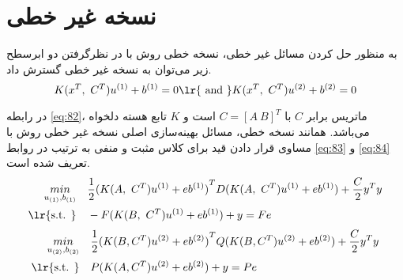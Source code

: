 %	
%	

\section{نسخه غیر خطی}\label{sec:3:3}
به منظور حل کردن مسائل غیر خطی، نسخه خطی روش  با در نظرگرفتن دو ابرسطح  زیر می‌توان به نسخه غیر خطی گسترش داد.
\begin{equation}\label{eq:82}
K({{x}^{T}},~{{C}^{T}}){{u}^{\left( 1 \right)}}+{{b}^{\left( 1 \right)}}=0 \text{\lr{ and }} K({{x}^{T}},~{{C}^{T}}){{u}^{\left( 2 \right)}}+{{b}^{\left( 2 \right)}}=0
\end{equation}

در رابطه \ref{eq:82}، ماتریس برابر $C$ با  $C=\left[ A \  B \right]^{T}$ است و $K$  تابع هسته دلخواه می‌باشد. همانند نسخه خطی، مسائل بهینه‌سازی اصلی نسخه غیر خطی روش   با مساوی قرار دادن قید برای کلاس مثبت و منفی به ترتیب در روابط \ref{eq:83} و \ref{eq:84} تعریف شده است.
\begin{align}
\mathop{{ min}}\limits_{u_{(1)} ,b_{(1)}} \quad & \frac{1}{2}{{(K(A,~{{C}^{T}}){{u}^{\left( 1 \right)}}+e{{b}^{\left( 1 \right)}})}^{T}}D(K( A,~{{C}^{T}}){{u}^{\left( 1 \right)}} \nonumber +e{{b}^{\left( 1 \right)}}) +\frac{C}{2}{{y}^{T}}y \nonumber \\
\textrm{\lr{s.t. }} \quad & 	-F(K(B,~{{C}^{T}}){{u}^{\left( 1 \right)}}+e{{b}^{\left( 1 \right)}})+y=Fe
\label{eq:83}
\end{align}
\begin{align}
\mathop{{ min}}\limits_{u_{(2)} ,b_{(2)}} \quad & \frac{1}{2}{{(K(B,{{C}^{T}}){{u}^{(2)}}+e{{b}^{(2)}})}^{T}}Q(K(B,{{C}^{T}}){{u}^{(2)}} \nonumber +e{{b}^{(2)}})+\frac{C}{2}{{y}^{T}}y \nonumber \\
\textrm{\lr{s.t. }} \quad & P(K(A,{{C}^{T}}){{u}^{(2)}}+e{{b}^{(2)}})+y=Pe
\label{eq:84}
\end{align}

